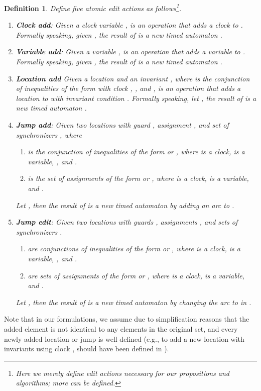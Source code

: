 \documentclass[10pt, a4paper, onecolumn, conference, compsocconf]{IEEEtran}
\newtheorem{defi}{Definition}
\begin{document}
\begin{defi} Define five atomic edit actions as follows\footnote{Here we merely define edit actions necessary for our propositions and algorithms; more can be defined.}.
\begin{enumerate}
\item \textbf{Clock add}: Given a clock variable ,  is an operation that adds a clock to .
      Formally speaking, given  , the result of  is a new timed automaton .
\item \textbf{Variable add}: Given a variable ,  is an operation that adds a variable to .
      Formally speaking, given  , the result of  is a new timed automaton .
\item \textbf{Location add}
    Given a location  and an invariant , where  is the conjunction of inequalities of the form  with clock ,  , and ,
      is an operation that adds a location to  with invariant condition .
   Formally speaking, let , the result of  is a new timed automaton
   .

\item \textbf{Jump add}:
    Given two locations  with guard , assignment , and set of synchronizers , where
    \begin{enumerate}
    \item  is the conjunction of inequalities of the form  or , where  is a clock,  is a variable, , and .
    \item  is the set of assignments of the form  or , where  is a clock,  is a variable, and .
    \end{enumerate}
    Let , then the result of  is a
    new timed automaton  by adding an arc  to .
\item \textbf{Jump edit}:
    Given two locations  with guards , assignments , and sets of synchronizers .
    \begin{enumerate}
    \item  are conjunctions of inequalities of the form  or , where  is a clock,  is a variable, , and .
    \item  are sets of assignments of the form  or , where  is a clock,  is a variable, and .
    \end{enumerate}
    Let , then the result of  is a new timed automaton
     by changing the arc  to  in .
\end{enumerate}
\end{defi}

Note that in our formulations, we assume due to simplification reasons that the added element is not identical to any elements in the original set, and
every newly added location or jump is well defined (e.g., to add  a new location with invariants using clock  ,  should have been
defined in ).
\end{document}
